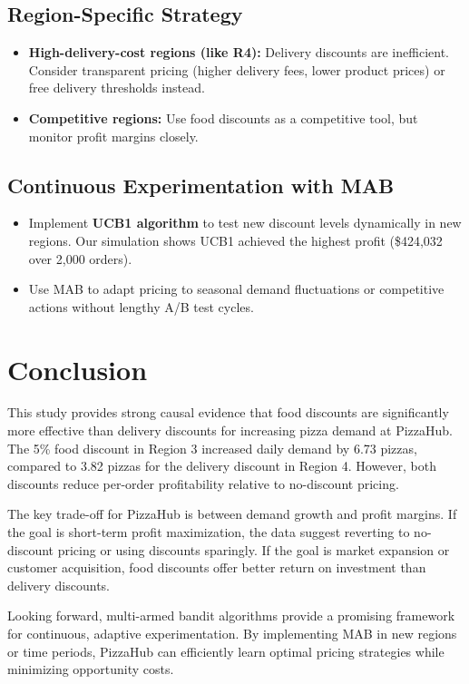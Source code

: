 \documentclass[12pt]{article}
\begin{document}
\subsection{Region-Specific Strategy}
\begin{itemize}[nosep]
    \item \textbf{High-delivery-cost regions (like R4):} Delivery discounts are inefficient. Consider transparent pricing (higher delivery fees, lower product prices) or free delivery thresholds instead.
    \item \textbf{Competitive regions:} Use food discounts as a competitive tool, but monitor profit margins closely.
\end{itemize}

\subsection{Continuous Experimentation with MAB}
\begin{itemize}[nosep]
    \item Implement \textbf{UCB1 algorithm} to test new discount levels dynamically in new regions. Our simulation shows UCB1 achieved the highest profit (\$424,032 over 2,000 orders).
    \item Use MAB to adapt pricing to seasonal demand fluctuations or competitive actions without lengthy A/B test cycles.
\end{itemize}

\section{Conclusion}

This study provides strong causal evidence that food discounts are significantly more effective than delivery discounts for increasing pizza demand at PizzaHub. The 5\% food discount in Region 3 increased daily demand by 6.73 pizzas, compared to 3.82 pizzas for the delivery discount in Region 4. However, both discounts reduce per-order profitability relative to no-discount pricing.

The key trade-off for PizzaHub is between demand growth and profit margins. If the goal is short-term profit maximization, the data suggest reverting to no-discount pricing or using discounts sparingly. If the goal is market expansion or customer acquisition, food discounts offer better return on investment than delivery discounts.

Looking forward, multi-armed bandit algorithms provide a promising framework for continuous, adaptive experimentation. By implementing MAB in new regions or time periods, PizzaHub can efficiently learn optimal pricing strategies while minimizing opportunity costs.
\end{document}
